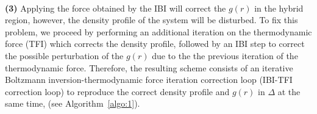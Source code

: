 \documentclass[aps,prb,preprint,citeautoscript]{revtex4}
\newcommand{\recheck}[1]{{\color{red} #1}}
\newcommand{\redc}[1]{{\color{red} #1}}
\renewcommand{\v}[1]{\textbf{\textit{#1}}}
\begin{document}
\\
{\bf (3)}  Applying the force obtained by the IBI will correct the $g(r)$ in the hybrid region, however,
the density profile of the system will be disturbed.
To fix this problem, we proceed by performing an additional iteration on the thermodynamic force (TFI) which corrects the density profile,
followed by an IBI step to correct the possible perturbation
of the $g(r)$ due to the the previous iteration of the thermodynamic force.
Therefore, the resulting scheme consists of an iterative
Boltzmann inversion-thermodynamic force iteration correction loop
(IBI-TFI correction loop) to reproduce the correct density
profile and $g(r)$ in $\Delta$ at the same time, (see Algorithm~\ref{algo:1}). 
\end{document}
